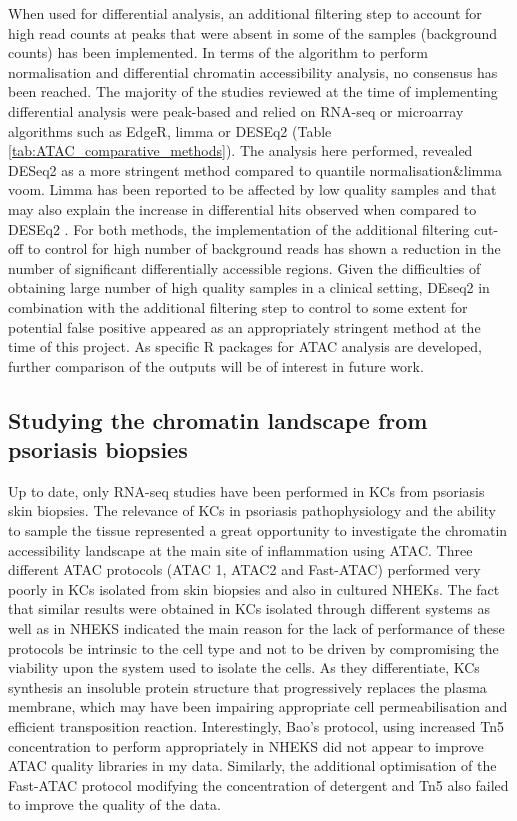 When used for differential analysis, an additional filtering step to account for high read counts at peaks that were absent in some of the samples (background counts) has been implemented. In terms of the algorithm to perform normalisation and differential chromatin accessibility analysis, no consensus has been reached. The majority of the studies reviewed at the time of implementing differential analysis were peak-based and relied on RNA-seq or microarray algorithms such as EdgeR, limma or DESEq2 (Table \ref{tab:ATAC_comparative_methods}). The analysis here performed, revealed DESeq2 as a more stringent method compared to quantile normalisation\&limma voom. Limma has been reported to be affected by low quality samples and that may also explain the increase in differential hits observed when compared to DESEq2 \parencite{Alasoo2018}. For both methods, the implementation of the additional filtering cut-off to control for high number of background reads has shown a reduction in the number of significant differentially accessible regions. Given the difficulties of obtaining large number of high quality samples in a clinical setting, DEseq2 in combination with the additional filtering step to control to some extent for potential false positive appeared as an appropriately stringent method at the time of this project. As specific R packages for ATAC analysis are developed, further comparison of the outputs will be of interest in future work.


\subsection{Studying the chromatin landscape from psoriasis biopsies}
Up to date, only RNA-seq studies have been performed in KCs from psoriasis skin biopsies. The relevance of KCs in psoriasis pathophysiology and the ability to sample the tissue represented a great opportunity to investigate the chromatin accessibility landscape at the main site of inflammation using ATAC. Three different ATAC protocols (ATAC 1, ATAC2 and Fast-ATAC) performed very poorly in KCs isolated from skin biopsies and also in cultured NHEKs. The fact that similar results were obtained in KCs isolated through different systems as well as in NHEKS indicated the main reason for the lack of performance of these protocols be intrinsic to the cell type and not to be driven by compromising the viability upon the system used to isolate the cells. As they differentiate, KCs synthesis an insoluble protein structure that progressively replaces the plasma membrane, which may have been impairing appropriate cell permeabilisation and efficient transposition reaction. Interestingly, Bao's protocol, using increased Tn5 concentration to perform appropriately in NHEKS did not appear to improve ATAC quality libraries in my data. Similarly, the additional optimisation of the Fast-ATAC protocol modifying the concentration of detergent and Tn5 also failed to improve the quality of the data.

